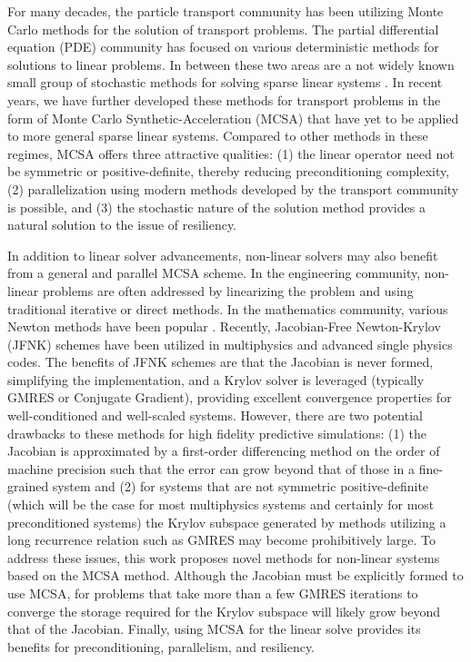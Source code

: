 For many decades, the particle transport community has been utilizing Monte
Carlo methods for the solution of transport problems. The partial differential
equation (PDE) community has focused on various deterministic methods for
solutions to linear problems. In between these two areas are a not widely
known small group of stochastic methods for solving sparse linear systems
\cite{hammersley_1964, halton_1962, halton_1994}. In recent years, we have
further developed these methods for transport problems in the form of Monte
Carlo Synthetic-Acceleration (MCSA) that have yet to be applied to more
general sparse linear systems. Compared to other methods in these regimes,
MCSA offers three attractive qualities: (1) the linear operator need not be
symmetric or positive-definite, thereby reducing preconditioning complexity,
(2) parallelization using modern methods developed by the transport community
\cite{Wagner:2011wc} is possible, and (3) the stochastic nature of the
solution method provides a natural solution to the issue of resiliency.

In addition to linear solver advancements, non-linear solvers may also benefit
from a general and parallel MCSA scheme. In the engineering community,
non-linear problems are often addressed by linearizing the problem and using
traditional iterative or direct methods. In the mathematics community, various
Newton methods have been popular \cite{kelley_1995}. Recently, Jacobian-Free
Newton-Krylov (JFNK) schemes \cite{knoll_2004} have been utilized in
multiphysics and advanced single physics codes. The benefits of JFNK schemes
are that the Jacobian is never formed, simplifying the implementation, and a
Krylov solver is leveraged (typically GMRES or Conjugate Gradient), providing
excellent convergence properties for well-conditioned and well-scaled
systems. However, there are two potential drawbacks to these methods for high
fidelity predictive simulations: (1) the Jacobian is approximated by a
first-order differencing method on the order of machine precision such that
the error can grow beyond that of those in a fine-grained system and (2) for
systems that are not symmetric positive-definite (which will be the case for
most multiphysics systems and certainly for most preconditioned systems) the
Krylov subspace generated by methods utilizing a long recurrence relation such
as GMRES may become prohibitively large. To address these issues, this work
proposes novel methods for non-linear systems based on the MCSA
method. Although the Jacobian must be explicitly formed to use MCSA, for
problems that take more than a few GMRES iterations to converge the storage
required for the Krylov subspace will likely grow beyond that of the
Jacobian. Finally, using MCSA for the linear solve provides its benefits for
preconditioning, parallelism, and resiliency.

